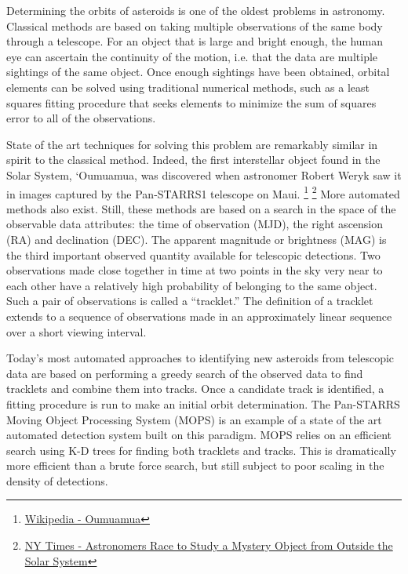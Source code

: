 Determining the orbits of asteroids is one of the oldest problems in astronomy.
Classical methods are based on taking multiple observations of the same body through a telescope.
For an object that is large and bright enough, the human eye can ascertain the continuity of the motion,
i.e. that the data are multiple sightings of the same object.
Once enough sightings have been obtained, orbital elements can be solved using traditional
numerical methods, such as a least squares fitting procedure that seeks elements to minimize
the sum of squares error to all of the observations.

State of the art techniques for solving this problem are remarkably similar in spirit to the classical method.
Indeed, the first interstellar object found in the Solar System, `Oumuamua, was discovered when astronomer Robert Weryk
saw it in images captured by the Pan-STARRS1 telescope on Maui.
\footnote{\href{https://en.wikipedia.org/wiki/\%CA\%BBOumuamua}{Wikipedia - Oumuamua}}
\footnote{\href{https://www.nytimes.com/2017/10/27/science/interstellar-object-solar-system.html}{NY Times - Astronomers Race to Study a Mystery Object from Outside the Solar System}}
More automated methods also exist.
Still, these methods are based on a search in the space of the observable data attributes: the time of observation (MJD), the right ascension (RA) and declination (DEC).
The apparent magnitude or brightness (MAG) is the third important observed quantity available for telescopic detections.
Two observations made close together in time at two points in the sky very near to each other have a relatively high probability of belonging to the same object.
Such a pair of observations is called a ``tracklet.''  The definition of a tracklet extends to a sequence of observations made in an approximately linear sequence over a short viewing interval.

Today's most automated approaches to identifying new asteroids from telescopic data are based on performing 
a greedy search of the observed data to find tracklets and combine them into tracks.
Once a candidate track is identified, a fitting procedure is run to make an initial orbit determination.
The Pan-STARRS Moving Object Processing System (MOPS) \cite{MOPS} is an example 
of a state of the art automated detection system built on this paradigm.
MOPS relies on an efficient search using K-D trees \cite{MOPS-KD-Tree} for finding both tracklets and tracks.  
This is dramatically more efficient than a brute force search, but still subject to poor scaling in the density of detections.

